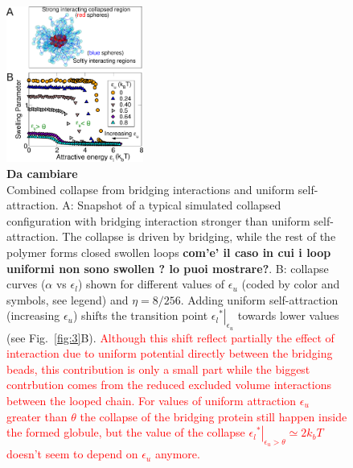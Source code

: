 \documentclass[
preprint,
a4paper,
12pt,
superscriptaddress,
pre]{revtex4}
\newcommand{\rev}[1]{\textcolor{red}{#1}}
\begin{document}
\begin{figure}
  \centering
  \includegraphics[width=0.4\textwidth]{fig4}
  \caption{\textbf{Da cambiare \\}Combined collapse from bridging
    interactions and uniform self-attraction.  A: Snapshot of a
    typical simulated collapsed configuration with bridging
    interaction stronger than uniform self-attraction. The collapse is
    driven by bridging, while the rest of the polymer forms closed
    swollen loops \textbf{com'e' il caso in cui i loop
      uniformi non sono swollen ? lo puoi mostrare?}.
    B: collapse curves ($\alpha$ vs $\epsilon_l$) shown for
    different values of $\epsilon_u$ (coded by color and symbols, see
    legend) and $\eta = 8/256$.
%
    Adding uniform self-attraction (increasing $\epsilon_u$) shifts
    the transition point $\left.{\epsilon_l}^*\right|_{\epsilon_u}$
    towards lower values (see Fig.~\ref{fig:3}B).
    \rev{Although this shift reflect partially the effect of
      interaction due to uniform potential directly between the
      bridging beads, this contribution is only a small part while the
      biggest contrbution comes from the reduced excluded volume
      interactions between the looped chain. For values of uniform
      attraction $\epsilon_u$ greater than $\theta$ the collapse of
      the bridging protein still happen inside the formed globule, but
      the value of the collapse
      $\left.{\epsilon_l}^*\right|_{\epsilon_u > \theta} \simeq 2k_bT$
      doesn't seem to depend on $\epsilon_u$ anymore.}} 
%

\end{figure}
\end{document}

